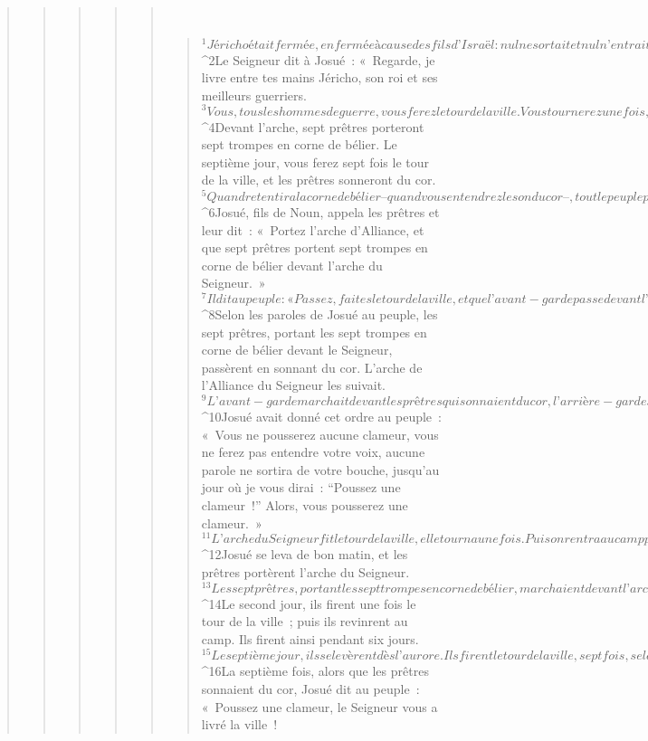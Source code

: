 \begin{verse}
\begin{verse}
\begin{verse}
\begin{verse}
\begin{verse}
         
      \bchapter{}
      \begin{verse}
${}^{1}Jéricho était fermée, enfermée à cause des fils d’Israël : nul ne sortait et nul n’entrait. 
${}^{2}Le Seigneur dit à Josué : « Regarde, je livre entre tes mains Jéricho, son roi et ses meilleurs guerriers. 
${}^{3}Vous, tous les hommes de guerre, vous ferez le tour de la ville. Vous tournerez une fois, et tu feras de même six jours durant. 
${}^{4}Devant l’arche, sept prêtres porteront sept trompes en corne de bélier. Le septième jour, vous ferez sept fois le tour de la ville, et les prêtres sonneront du cor. 
${}^{5}Quand retentira la corne de bélier – quand vous entendrez le son du cor –, tout le peuple poussera une grande clameur ; alors, le rempart de la ville s’effondrera sur place et le peuple montera à l’assaut, chacun droit devant soi. »
${}^{6}Josué, fils de Noun, appela les prêtres et leur dit : « Portez l’arche d’Alliance, et que sept prêtres portent sept trompes en corne de bélier devant l’arche du Seigneur. » 
${}^{7}Il dit au peuple : « Passez, faites le tour de la ville, et que l’avant-garde passe devant l’arche du Seigneur. »
${}^{8}Selon les paroles de Josué au peuple, les sept prêtres, portant les sept trompes en corne de bélier devant le Seigneur, passèrent en sonnant du cor. L’arche de l’Alliance du Seigneur les suivait. 
${}^{9}L’avant-garde marchait devant les prêtres qui sonnaient du cor, l’arrière-garde suivait l’arche. On marchait et on sonnait du cor.
${}^{10}Josué avait donné cet ordre au peuple : « Vous ne pousserez aucune clameur, vous ne ferez pas entendre votre voix, aucune parole ne sortira de votre bouche, jusqu’au jour où je vous dirai : “Poussez une clameur !” Alors, vous pousserez une clameur. »
${}^{11}L’arche du Seigneur fit le tour de la ville, elle tourna une fois. Puis on rentra au camp pour y passer la nuit. 
${}^{12}Josué se leva de bon matin, et les prêtres portèrent l’arche du Seigneur. 
${}^{13}Les sept prêtres, portant les sept trompes en corne de bélier, marchaient devant l’arche du Seigneur en sonnant du cor. L’avant-garde marchait devant eux, l’arrière-garde suivait l’arche du Seigneur : on marchait en sonnant du cor.
${}^{14}Le second jour, ils firent une fois le tour de la ville ; puis ils revinrent au camp. Ils firent ainsi pendant six jours. 
${}^{15}Le septième jour, ils se levèrent dès l’aurore. Ils firent le tour de la ville, sept fois, selon le même rite. Ce jour-là seulement, ils firent sept fois le tour de la ville. 
${}^{16}La septième fois, alors que les prêtres sonnaient du cor, Josué dit au peuple : « Poussez une clameur, le Seigneur vous a livré la ville ! 

\end{verse}
\end{verse}
\end{verse}
\end{verse}
\end{verse}
\end{verse}
